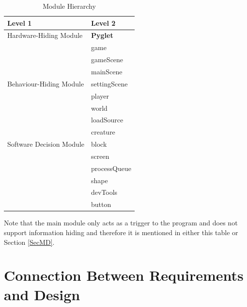 \documentclass[12pt, titlepage]{article}
\begin{document}
\FloatBarrier
\begin{table}[h!]
\centering
\begin{tabular}{p{} | p{}}
\toprule
\textbf{Level 1} & \textbf{Level 2}\\
\midrule

{Hardware-Hiding Module} & \textbf{Pyglet} \\
\midrule

\multirow{7}{0.3\textwidth}{Behaviour-Hiding Module} & game\\
& gameScene\\
& mainScene\\
& settingScene\\
& player\\
& world\\
& loadSource\\
\midrule

\multirow{3}{0.3\textwidth}{Software Decision Module} & creature\\
& block\\
& screen\\
& processQueue\\
& shape\\
& devTools\\
& button\\
\bottomrule
\end{tabular}
\begin{tablenotes}
\item *Note that the main module only acts as a trigger to the program and does not support information hiding and therefore it is mentioned in either this table or Section \ref{SecMD}.
\end{tablenotes}
\caption{Module Hierarchy}
\label{TblMH}
\end{table}
\FloatBarrier
\section{Connection Between Requirements and Design} \label{SecConnection}
\end{document}
